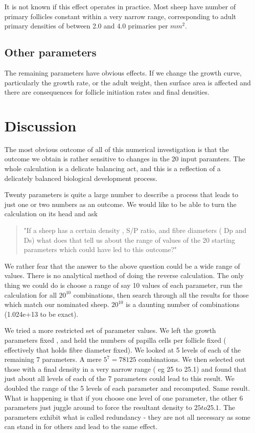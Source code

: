 \documentclass[titlepage]{article}  %
\begin{document}
It is not known if this effect operates in practice. Most sheep have number of primary follicles constant within a very narrow range, corresponding to adult primary densities of between 2.0 and 4.0 primaries per $mm^{2}$.

\subsection{Other parameters}
The remaining parameters have obvious effects. If we change the growth curve, particularly the growth rate, or the adult weight, then surface area is affected and there are consequences for follicle initiation rates and final densities. 

\clearpage
\section{Discussion}
The most obvious outcome of all of this numerical investigation is that the outcome we obtain is rather sensitive to changes in the 20 input paramters. The whole calculation is a delicate balancing act, and this is a reflection of a delicately balanced biological development process. 

Twenty parameters is quite a large number to describe a process that leads to just one or two numbers as an outcome. We would like to be able to turn the  calculation on its head and ask
\begin{quote}
"If a sheep has a certain density , S/P ratio, and fibre diameters ( Dp and Ds) what does that tell us about the range of values of the 20 starting parameters which could have led to this outcome?"
\end{quote}

We rather fear that the answer to the above question could be a wide range of values. There is no analytical method of doing the reverse calculation. The only thing we could do is choose a range of say 10 values of each parameter, run the calculation for all $20^{10}$ combinations, then search through all the results for those which match our nominated sheep.  $20^{10}$ is a daunting number of combinations (1.024e+13 to be exact).

We tried a more restricted set of parameter values. We left the growth parameters fixed , and held the numbers of papilla cells per follicle fixed ( effectively that holds fibre diameter fixed). We looked at 5 levels of each of the remaining 7 parameters. A mere $5^7 = 78125$ combinations. We then selected out those with a final density in a very narrow range ( eg 25 to 25.1) and found that just about all levels of each of the 7 parameters could lead to this result. We doubled the range of the 5 levels of each parameter and recomputed. Same result. What is happening is that if you choose one level of one parameter, the other 6 parameters just juggle around to force the resultant density to $25 to 25.1$. The parameters exhibit what is called redundancy - they are not all necessary as some can stand in for others and lead to the same effect.
\end{document}
